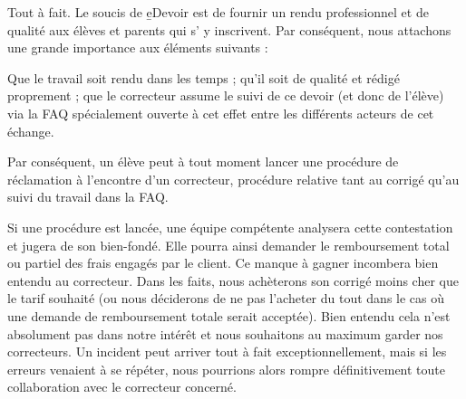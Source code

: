﻿Tout à fait. Le soucis de \b{eDevoir} est de fournir un rendu professionnel et de qualité aux élèves et parents qui s’ y inscrivent. Par conséquent, nous attachons une grande importance aux éléments suivants :
\begin{itemize}
	\li Que le travail soit rendu dans les temps ;
	\li qu’il soit de qualité et rédigé proprement ;
	\li que le correcteur assume le suivi de ce devoir (et donc de l’élève) via la FAQ spécialement ouverte à cet effet entre les différents acteurs de cet échange.
\end{itemize}

Par conséquent, un élève peut à tout moment lancer une procédure de réclamation à l’encontre d’un correcteur, procédure relative tant au corrigé qu’au suivi du travail dans la FAQ.

Si une procédure est lancée, une équipe compétente analysera cette contestation et jugera de son bien-fondé. Elle pourra ainsi demander le remboursement total ou partiel des frais engagés par le client. Ce manque à gagner incombera bien entendu au correcteur. Dans les faits, nous achèterons son corrigé moins cher que le tarif souhaité (ou nous déciderons de ne pas l'acheter du tout dans le cas où une demande de remboursement totale serait acceptée). Bien entendu cela n'est absolument pas dans notre intérêt et nous souhaitons au maximum garder nos correcteurs. Un incident peut arriver tout à fait exceptionnellement, mais si les erreurs venaient à se répéter, nous pourrions alors rompre définitivement toute collaboration avec le correcteur concerné.